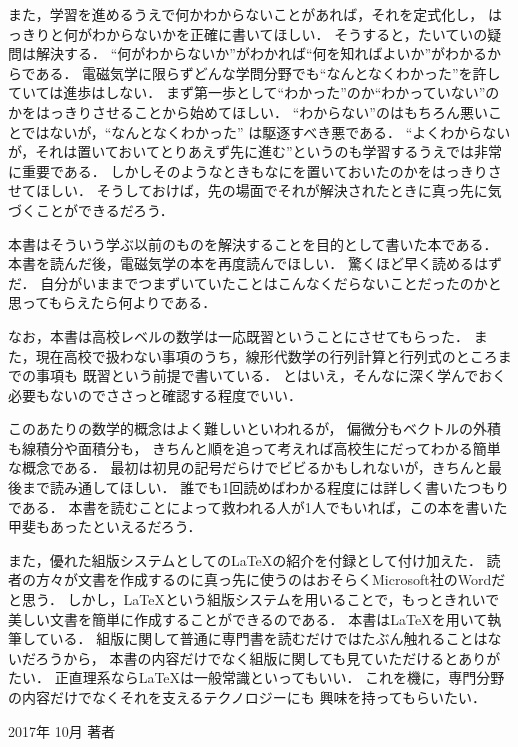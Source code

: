また，学習を進めるうえで何かわからないことがあれば，それを定式化し，
はっきりと何がわからないかを正確に書いてほしい．
そうすると，たいていの疑問は解決する．
``何がわからないか''がわかれば``何を知ればよいか''がわかるからである．
電磁気学に限らずどんな学問分野でも``なんとなくわかった''を許していては進歩はしない．
まず第一歩として``わかった''のか``わかっていない''のかをはっきりさせることから始めてほしい．
``わからない''のはもちろん悪いことではないが，``なんとなくわかった''
は駆逐すべき悪である．
``よくわからないが，それは置いておいてとりあえず先に進む''というのも学習するうえでは非常に重要である．
しかしそのようなときもなにを置いておいたのかをはっきりさせてほしい．
そうしておけば，先の場面でそれが解決されたときに真っ先に気づくことができるだろう．

本書はそういう学ぶ以前のものを解決することを目的として書いた本である．
本書を読んだ後，電磁気学の本を再度読んでほしい．
驚くほど早く読めるはずだ．
自分がいままでつまずいていたことはこんなくだらないことだったのかと思ってもらえたら何よりである．

なお，本書は高校レベルの数学は一応既習ということにさせてもらった．
また，現在高校で扱わない事項のうち，線形代数学の行列計算と行列式のところまでの事項も
既習という前提で書いている．
とはいえ，そんなに深く学んでおく必要もないのでささっと確認する程度でいい．

このあたりの数学的概念はよく難しいといわれるが，
偏微分もベクトルの外積も線積分や面積分も，
きちんと順を追って考えれば高校生にだってわかる簡単な概念である．
最初は初見の記号だらけでビビるかもしれないが，きちんと最後まで読み通してほしい．
誰でも1回読めばわかる程度には詳しく書いたつもりである．
本書を読むことによって救われる人が1人でもいれば，この本を書いた甲斐もあったといえるだろう．

また，優れた組版システムとしての{\LaTeX}の紹介を付録として付け加えた．
読者の方々が文書を作成するのに真っ先に使うのはおそらくMicrosoft社のWordだと思う．
しかし，{\LaTeX}という組版システムを用いることで，もっときれいで美しい文書を簡単に作成することができるのである．
本書は{\LaTeX}を用いて執筆している．
組版に関して普通に専門書を読むだけではたぶん触れることはないだろうから，
本書の内容だけでなく組版に関しても見ていただけるとありがたい．
正直理系なら{\LaTeX}は一般常識といってもいい．
これを機に，専門分野の内容だけでなくそれを支えるテクノロジーにも
興味を持ってもらいたい．

\begin{flushright}
2017年 10月 著者 
\end{flushright}